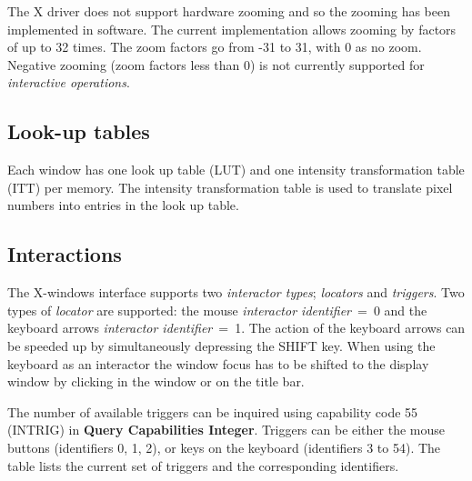 The X driver does not support hardware zooming and so the zooming has
been implemented in software. The current implementation allows zooming
by factors of up to 32 times. The zoom factors go from -31 to 31, with
0 as no zoom. Negative zooming (zoom factors less than 0) is not
currently supported for {\it interactive operations}.

\subsection{Look-up tables}

Each window has one look up table (LUT) and one intensity transformation
table (ITT) per memory. The intensity transformation table is used to
translate pixel numbers into entries in the look up table.

\subsection{Interactions\label{interactions-cross-ref}}

The X-windows interface supports two {\it interactor types}; {\it locators}
and {\it triggers}. Two types of {\it locator} are supported: the mouse
{\it interactor identifier}~=~0 and the keyboard arrows
{\it interactor identifier}~=~1. The action of the keyboard arrows can be
speeded up by simultaneously depressing the SHIFT key. When using the keyboard
as an interactor the window focus has to be shifted to the display window
by clicking in the window or on the title bar.

The number of available triggers can be inquired using capability code
55 (INTRIG) in {\bf Query Capabilities Integer}.
Triggers can be either the mouse buttons (identifiers 0, 1, 2), or keys on
the keyboard (identifiers 3 to 54). The table lists the current set
of triggers and the corresponding identifiers.


